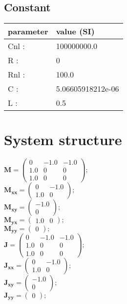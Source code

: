 \documentclass[11pt, oneside]{article}      %
\begin{document}
\subsection{Constant}
%
\begin{center}
%
\begin{tabular}{ll}
%
\hline
parameter & value (SI)
\\ \hline
Cnl :& 100000000.0
\\
R :& 0
\\
Rnl :& 100.0
\\
C :& 5.06605918212e-06
\\
L :& 0.5
\\
\hline
\end{tabular}
%
\end{center}
%
\section{System structure}
%

%
$ \mathbf{M} = \left(\begin{array}{ccc}0 & -1.0 & -1.0\\1.0 & 0 & 0\\1.0 & 0 & 0\end{array}\right) ; $ 
%
\\
%
$ \mathbf{M_{xx}} = \left(\begin{array}{cc}0 & -1.0\\1.0 & 0\end{array}\right) ; $ 
%
\\
%
$ \mathbf{M_{xy}} = \left(\begin{array}{c}-1.0\\0\end{array}\right) ; $ 
%
\\
%
$ \mathbf{M_{yx}} = \left(\begin{array}{cc}1.0 & 0\end{array}\right) ; $ 
%
\\
%
$ \mathbf{M_{yy}} = \left(\begin{array}{c}0\end{array}\right) ; $ 
%
\\
%

%
$ \mathbf{J} = \left(\begin{array}{ccc}0 & -1.0 & -1.0\\1.0 & 0 & 0\\1.0 & 0 & 0\end{array}\right) ; $ 
%
\\
%
$ \mathbf{J_{xx}} = \left(\begin{array}{cc}0 & -1.0\\1.0 & 0\end{array}\right) ; $ 
%
\\
%
$ \mathbf{J_{xy}} = \left(\begin{array}{c}-1.0\\0\end{array}\right) ; $ 
%
\\
%
$ \mathbf{J_{yy}} = \left(\begin{array}{c}0\end{array}\right) ; $ 
%
\\
%
\end{document}
